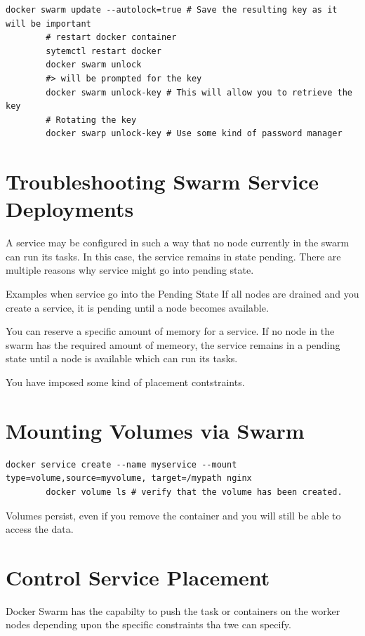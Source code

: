 \documentclass[11pt]{book}
\begin{document}
    \begin{lstlisting}[style=terminal]
        docker swarm update --autolock=true # Save the resulting key as it will be important
        # restart docker container
        sytemctl restart docker
        docker swarm unlock
        #> will be prompted for the key
        docker swarm unlock-key # This will allow you to retrieve the key
        # Rotating the key
        docker swarp unlock-key # Use some kind of password manager
    \end{lstlisting}

    \section{Troubleshooting Swarm Service Deployments}
    A service may be configured in such a way that no node currently in the swarm can run its tasks.
    In this case, the service remains in state pending.
    There are multiple reasons why service might go into pending state.

    Examples when service go into the Pending State
    If all nodes are drained and you create a service, it is pending until a node becomes available.

    You can reserve a specific amount of memory for a service. If no node in the swarm has the required amount of memeory, the service remains in a pending state until a node is available which can run its tasks.

    You have imposed some kind of placement contstraints.

    \section{Mounting Volumes via Swarm}

    \begin{lstlisting}[style=terminal]
        docker service create --name myservice --mount type=volume,source=myvolume, target=/mypath nginx
        docker volume ls # verify that the volume has been created.
    \end{lstlisting}

    Volumes persist, even if you remove the container and you will still be able to access the data.
    
    \section{Control Service Placement}

    Docker Swarm has the capabilty to push the task or containers on the worker nodes depending upon the specific constraints tha twe can specify.
\end{document}
